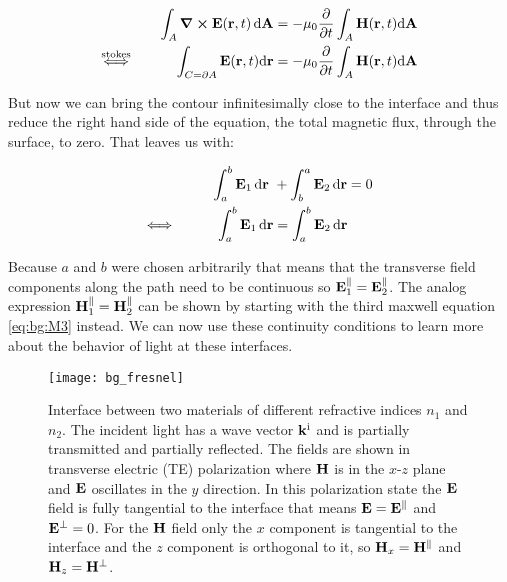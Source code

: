 \begin{equation}
\begin{aligned}
    \int_A \curl \vb E(\vb r, t) \, \dd \vb A
    &= - \mu_0 \pdv t \int_A \vb H(\vb r, t) \dd \vb A\\
    \overset{\mathrm{stokes}}{\Longleftrightarrow} \hspace{3em}
    \int_{C = \partial A} \vb E(\vb r, t) \dd \vb r
    &= - \mu_0 \pdv t \int_A \vb H(\vb r, t) \dd \vb A\\
\end{aligned}
\end{equation}

But now we can bring the contour infinitesimally close to the interface and thus reduce the right hand side of the equation, the total magnetic flux, through the surface, to zero. That leaves us with:

\begin{equation}
\begin{aligned}
    \int_a^b \vb E_1 \, \dd \vb r \ &+ \int_b^a \vb E_2 \,  \dd \vb r = 0\\
    \Longleftrightarrow \hspace{3em}
    \int_a^b \vb E_1 \, \dd \vb r &= \int_a^b \vb E_2 \,  \dd \vb r \\
\end{aligned}
\end{equation}

Because $a$ and $b$ were chosen arbitrarily that means that the transverse field components along the path need to be continuous so
$\vb E_1^{\parallel} = \vb E_2^{\parallel}$.
The analog expression
$\vb H_1^{\parallel} = \vb H_2^{\parallel}$
can be shown by starting with the third maxwell equation \eqref{eq:bg:M3} instead. We can now use these continuity conditions to learn more about the behavior of light at these interfaces.

\begin{figure}[H]
    \centering
    \texttt{[image: bg\_fresnel]}
    \caption{Interface between two materials of different refractive indices $n_1$ and $n_2$. The incident light has a wave vector $\vb k^{\mathrm{i}}$ and is partially transmitted and partially reflected. The fields are shown in transverse electric (TE) polarization where $\vb H$ is in the $x$-$z$ plane and $\vb E$ oscillates in the $y$ direction.
    In this polarization state the $\vb E$ field is fully tangential to the interface that means 
    $\vb E = \vb E^\parallel$ and $\vb E^\bot = 0$.
    For the $\vb H$ field only the $x$ component is tangential to the interface and the $z$ component is orthogonal to it, so 
    $\vb H_x = \vb H^\parallel$ and $\vb H_z = \vb H^\bot$.}
    \label{fig:bg:fresnel}
\end{figure}

